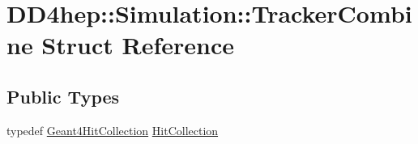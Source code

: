 \hypertarget{struct_d_d4hep_1_1_simulation_1_1_tracker_combine}{
\section{DD4hep::Simulation::TrackerCombine Struct Reference}
\label{struct_d_d4hep_1_1_simulation_1_1_tracker_combine}
}
\subsection*{Public Types}
\begin{DoxyCompactItemize}
\item 
typedef \hyperlink{class_d_d4hep_1_1_simulation_1_1_geant4_hit_collection}{Geant4HitCollection} \hyperlink{struct_d_d4hep_1_1_simulation_1_1_tracker_combine_ae776b8d22a42d425b4d9b6344ed430e1}{HitCollection}
\end{DoxyCompactItemize}
